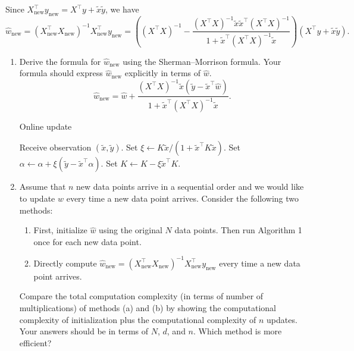 \documentclass[a3paper,12pt]{extarticle} %
\begin{document}
\begin{enumerate}
        Since \( X_{\text{new}}^\top y_{\text{new}} = X^\top y + \tilde{x} \tilde{y} \), we have
        \[
        \hat{w}_{\text{new}} = (X_{\text{new}}^\top X_{\text{new}})^{-1} X_{\text{new}}^\top y_{\text{new}} = \left( (X^\top X)^{-1} - \frac{(X^\top X)^{-1} \tilde{x} \tilde{x}^\top (X^\top X)^{-1}}{1 + \tilde{x}^\top (X^\top X)^{-1} \tilde{x}} \right) (X^\top y + \tilde{x} \tilde{y}).
        \]

        \begin{enumerate}
            \item Derive the formula for \( \hat{w}_{\text{new}} \) using the Sherman–Morrison formula. Your formula should express \( \hat{w}_{\text{new}} \) explicitly in terms of \( \hat{w} \).
            \[
            \hat{w}_{\text{new}} = \hat{w} + \frac{(X^\top X)^{-1} \tilde{x} (\tilde{y} - \tilde{x}^\top \hat{w})}{1 + \tilde{x}^\top (X^\top X)^{-1} \tilde{x}}.
            \]

            \begin{algorithm}
            \caption{Online update}
            \begin{algorithmic}[1]
                \State Receive observation \( (\tilde{x}, \tilde{y}) \).
                \State Set \( \xi \leftarrow K \tilde{x} / (1 + \tilde{x}^\top K \tilde{x}) \).
                \State Set \( \alpha \leftarrow \alpha + \xi (\tilde{y} - \tilde{x}^\top \alpha) \).
                \State Set \( K \leftarrow K - \xi \tilde{x}^\top K \).
            \end{algorithmic}
            \end{algorithm}
            \item Assume that \( n \) new data points arrive in a sequential order and we would like to update \( \hat{w} \) every time a new data point arrives. Consider the following two methods:
            \begin{enumerate}
                \item First, initialize \( \hat{w} \) using the original \( N \) data points. Then run Algorithm 1 once for each new data point.
                \item Directly compute \( \hat{w}_{\text{new}} = (X_{\text{new}}^\top X_{\text{new}})^{-1} X_{\text{new}}^\top y_{\text{new}} \) every time a new data point arrives.
            \end{enumerate}
            Compare the total computation complexity (in terms of number of multiplications) of methods (a) and (b) by showing the computational complexity of initialization plus the computational complexity of \( n \) updates. Your answers should be in terms of \( N \), \( d \), and \( n \). Which method is more efficient?


\end{enumerate}
\end{enumerate}
\end{document}
